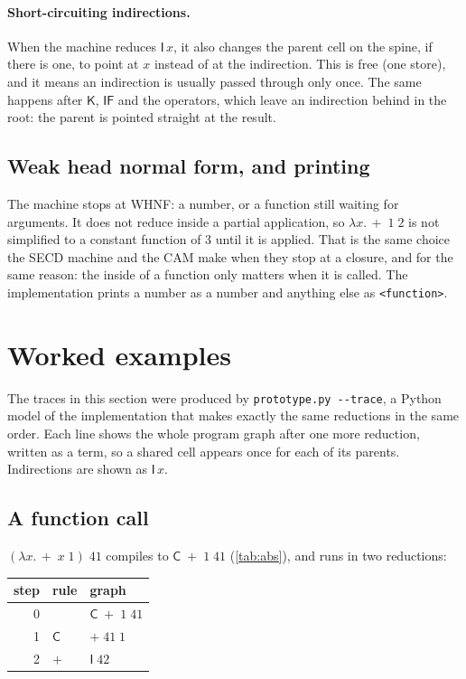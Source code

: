 \documentclass[11pt,a4paper]{article}
\newcommand{\cmb}[1]{\textsf{#1}}
\newcommand{\I}{\cmb{I}}
\newcommand{\K}{\cmb{K}}
\newcommand{\C}{\cmb{C}}
\newcommand{\IF}{\cmb{IF}}
\theoremstyle{definition}
\theoremstyle{plain}
\begin{document}
\paragraph{Short-circuiting indirections.} When the machine reduces
$\I\,x$, it also changes the parent cell on the spine, if there is one, to
point at $x$ instead of at the indirection. This is free (one store), and it
means an indirection is usually passed through only once. The same happens
after $\K$, $\IF$ and the operators, which leave an indirection behind in the
root: the parent is pointed straight at the result.

\subsection{Weak head normal form, and printing}

The machine stops at WHNF: a number, or a function still waiting for
arguments. It does not reduce inside a partial application, so
$\lambda x.\,{+}\;1\;2$ is not simplified to a constant function of 3 until it
is applied. That is the same choice the SECD machine and the CAM make when
they stop at a closure, and for the same reason: the inside of a function
only matters when it is called. The implementation prints a number as a
number and anything else as \verb|<function>|.

\section{Worked examples}\label{sec:examples}

The traces in this section were produced by \texttt{prototype.py
-{}-trace}, a Python model of the implementation that makes exactly the same
reductions in the same order. Each line shows the whole program graph after
one more reduction, written as a term, so a shared cell appears once for each
of its parents. Indirections are shown as $\I\,x$.

\subsection{A function call}

$(\lambda x.\,{+}\;x\;1)\;41$ compiles to $\C\;{+}\;1\;41$ (\cref{tab:abs}),
and runs in two reductions:

\begin{center}
\small
\begin{tabular}{@{}r l l@{}}
\toprule
step & rule & graph\\
\midrule
0 & & $\C\;{+}\;1\;41$\\
1 & $\C$ & ${+}\;41\;1$\\
2 & ${+}$ & $\I\;42$\\
\bottomrule
\end{tabular}
\end{center}
\end{document}
